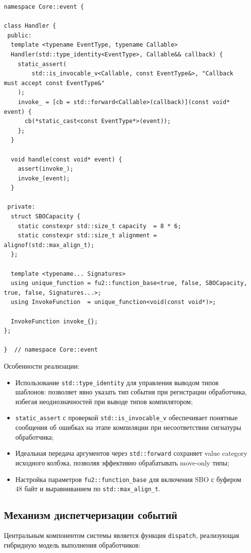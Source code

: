 \documentclass[12pt,a4paper]{report}
\begin{document}
\begin{lstlisting}[caption={Реализация Handler с small buffer optimization},label=lst:handler]
namespace Core::event {

class Handler {
 public:
  template <typename EventType, typename Callable>
  Handler(std::type_identity<EventType>, Callable&& callback) {
    static_assert(
        std::is_invocable_v<Callable, const EventType&>, "Callback must accept const EventType&"
    );
    invoke_ = [cb = std::forward<Callable>(callback)](const void* event) {
      cb(*static_cast<const EventType*>(event));
    };
  }

  void handle(const void* event) {
    assert(invoke_);
    invoke_(event);
  }

 private:
  struct SBOCapacity {
    static constexpr std::size_t capacity  = 8 * 6;
    static constexpr std::size_t alignment = alignof(std::max_align_t);
  };

  template <typename... Signatures>
  using unique_function = fu2::function_base<true, false, SBOCapacity, true, false, Signatures...>;
  using InvokeFunction  = unique_function<void(const void*)>;

  InvokeFunction invoke_{};
};

}  // namespace Core::event
\end{lstlisting}

Особенности реализации:
\begin{itemize}
    \item Использование \texttt{std::type\_identity} для управления выводом типов шаблонов: позволяет явно указать тип события при регистрации обработчика, избегая неоднозначностей при выводе типов компилятором;
    \item \texttt{static\_assert} с проверкой \texttt{std::is\_invocable\_v} обеспечивает понятные сообщения об ошибках на этапе компиляции при несоответствии сигнатуры обработчика;
    \item Идеальная передача аргументов через \texttt{std::forward} сохраняет value category исходного колбэка, позволяя эффективно обрабатывать move-only типы;
    \item Настройка параметров \texttt{fu2::function\_base} для включения SBO с буфером 48 байт и выравниванием по \texttt{std::max\_align\_t}.
\end{itemize}

\subsection{Механизм диспетчеризации событий}
Центральным компонентом системы является функция \texttt{dispatch}, реализующая гибридную модель выполнения обработчиков:
\end{document}
